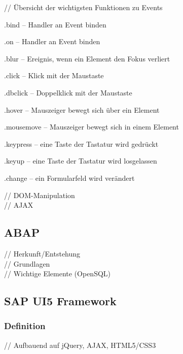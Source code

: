 \documentclass[12pt,a4paper,bibliography=totocnumbered,listof=totocnumbered]{scrartcl}
\begin{document}
// Übersicht der wichtigsten Funktionen zu Events
    \begin{compactitem}
	    \item .bind – Handler an Event binden
	    \item .on – Handler an Event binden
	    \item .blur – Ereignis, wenn ein Element den Fokus verliert
	    \item .click – Klick mit der Maustaste
	    \item .dbclick – Doppelklick mit der Maustaste
	    \item .hover – Mauszeiger bewegt sich über ein Element
	    \item .mousemove – Mauszeiger bewegt sich in einem Element
	    \item .keypress – eine Taste der Tastatur wird gedrückt
	    \item .keyup – eine Taste der Tastatur wird losgelassen
	    \item .change – ein Formularfeld wird verändert
    \end{compactitem}
    
// DOM-Manipulation\\

// AJAX\\

\subsection{ABAP}
// Herkunft/Entstehung\\
// Grundlagen\\
// Wichtige Elemente (OpenSQL)\\

\subsection{SAP UI5 Framework}
\subsubsection{Definition}
// Aufbauend auf jQuery, AJAX, HTML5/CSS3 \cite{AntoEinf2014}\\
\end{document}
